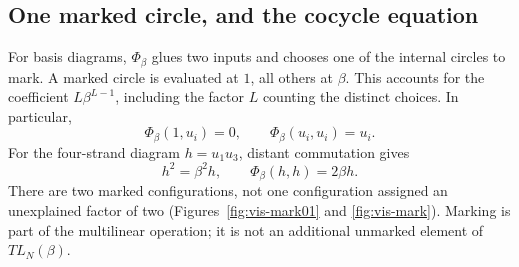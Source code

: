 \documentclass[a4paper,11pt,oneside,reqno]{amsart}
\theoremstyle{definition}
\numberwithin{equation}{section}
\begin{document}
\subsection{One marked circle, and the cocycle equation}
For basis diagrams, $\Phi_\beta$ glues two inputs and chooses one of the
internal circles to mark. A marked circle is evaluated at $1$, all
others at $\beta$. This accounts for the coefficient $L\beta^{L-1}$,
including the factor $L$ counting the distinct choices. In particular,
\[
 \Phi_\beta(1,u_i)=0,\qquad\Phi_\beta(u_i,u_i)=u_i.
\]
For the four-strand diagram $h=u_1u_3$, distant commutation gives
\begin{equation}\label{vis:two-loops}
 h^2=\beta^2h,\qquad \Phi_\beta(h,h)=2\beta h.
\end{equation}
There are two marked configurations, not one configuration assigned an
unexplained factor of two (Figures~\ref{fig:vis-mark01} and
\ref{fig:vis-mark}). Marking is part of the multilinear operation; it
is not an additional unmarked element of $TL_N(\beta)$.
\end{document}
